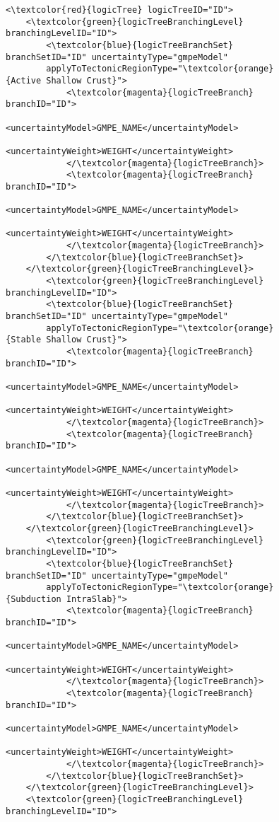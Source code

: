 \begin{figure}[htbp]
\begin{center}
\begin{Verbatim}[frame=single, commandchars=\\\{\},fontsize=\scriptsize, samepage=true]
<\textcolor{red}{logicTree} logicTreeID="ID">       
	<\textcolor{green}{logicTreeBranchingLevel} branchingLevelID="ID">
		<\textcolor{blue}{logicTreeBranchSet} branchSetID="ID" uncertaintyType="gmpeModel" 
		applyToTectonicRegionType="\textcolor{orange}{Active Shallow Crust}">
			<\textcolor{magenta}{logicTreeBranch} branchID="ID">
				<uncertaintyModel>GMPE_NAME</uncertaintyModel>
				<uncertaintyWeight>WEIGHT</uncertaintyWeight>
			</\textcolor{magenta}{logicTreeBranch}>
			<\textcolor{magenta}{logicTreeBranch} branchID="ID">
				<uncertaintyModel>GMPE_NAME</uncertaintyModel>
				<uncertaintyWeight>WEIGHT</uncertaintyWeight>
			</\textcolor{magenta}{logicTreeBranch}>                
		</\textcolor{blue}{logicTreeBranchSet}>       
	</\textcolor{green}{logicTreeBranchingLevel}>
		<\textcolor{green}{logicTreeBranchingLevel} branchingLevelID="ID">
		<\textcolor{blue}{logicTreeBranchSet} branchSetID="ID" uncertaintyType="gmpeModel" 
		applyToTectonicRegionType="\textcolor{orange}{Stable Shallow Crust}">
			<\textcolor{magenta}{logicTreeBranch} branchID="ID">
				<uncertaintyModel>GMPE_NAME</uncertaintyModel>
				<uncertaintyWeight>WEIGHT</uncertaintyWeight>
			</\textcolor{magenta}{logicTreeBranch}>
			<\textcolor{magenta}{logicTreeBranch} branchID="ID">
				<uncertaintyModel>GMPE_NAME</uncertaintyModel>
				<uncertaintyWeight>WEIGHT</uncertaintyWeight>
			</\textcolor{magenta}{logicTreeBranch}>                
		</\textcolor{blue}{logicTreeBranchSet}>       
	</\textcolor{green}{logicTreeBranchingLevel}>
		<\textcolor{green}{logicTreeBranchingLevel} branchingLevelID="ID">
		<\textcolor{blue}{logicTreeBranchSet} branchSetID="ID" uncertaintyType="gmpeModel" 
		applyToTectonicRegionType="\textcolor{orange}{Subduction IntraSlab}">
			<\textcolor{magenta}{logicTreeBranch} branchID="ID">
				<uncertaintyModel>GMPE_NAME</uncertaintyModel>
				<uncertaintyWeight>WEIGHT</uncertaintyWeight>
			</\textcolor{magenta}{logicTreeBranch}>
			<\textcolor{magenta}{logicTreeBranch} branchID="ID">
				<uncertaintyModel>GMPE_NAME</uncertaintyModel>
				<uncertaintyWeight>WEIGHT</uncertaintyWeight>
			</\textcolor{magenta}{logicTreeBranch}>                
		</\textcolor{blue}{logicTreeBranchSet}>       
	</\textcolor{green}{logicTreeBranchingLevel}>
	<\textcolor{green}{logicTreeBranchingLevel} branchingLevelID="ID">

\end{Verbatim}
\end{center}
\end{figure}
